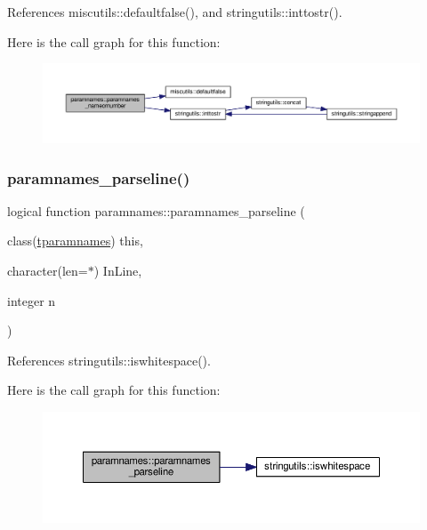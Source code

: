 References miscutils\+::defaultfalse(), and stringutils\+::inttostr().

Here is the call graph for this function\+:
\nopagebreak
\begin{figure}[H]
\begin{center}
\leavevmode
\includegraphics[width=350pt]{namespaceparamnames_aeeea5572332bd77485fd7e18d1461e56_cgraph}
\end{center}
\end{figure}
\mbox{\label{namespaceparamnames_a6d210fed8da76c1fe28e96b8c0724666}} 
\subsubsection{\texorpdfstring{paramnames\+\_\+parseline()}{paramnames\_parseline()}}
{\footnotesize\ttfamily logical function paramnames\+::paramnames\+\_\+parseline (\begin{DoxyParamCaption}\item[{class(\mbox{\hyperlink{structparamnames_1_1tparamnames}{tparamnames}})}]{this,  }\item[{character(len=$\ast$)}]{In\+Line,  }\item[{integer}]{n }\end{DoxyParamCaption})\hspace{0.3cm}{\ttfamily [private]}}



References stringutils\+::iswhitespace().

Here is the call graph for this function\+:
\nopagebreak
\begin{figure}[H]
\begin{center}
\leavevmode
\includegraphics[width=350pt]{namespaceparamnames_a6d210fed8da76c1fe28e96b8c0724666_cgraph}
\end{center}
\end{figure}
\mbox{\label{namespaceparamnames_a1f770d70e7cc5a35f6a617f5ae2f4c07}} 
